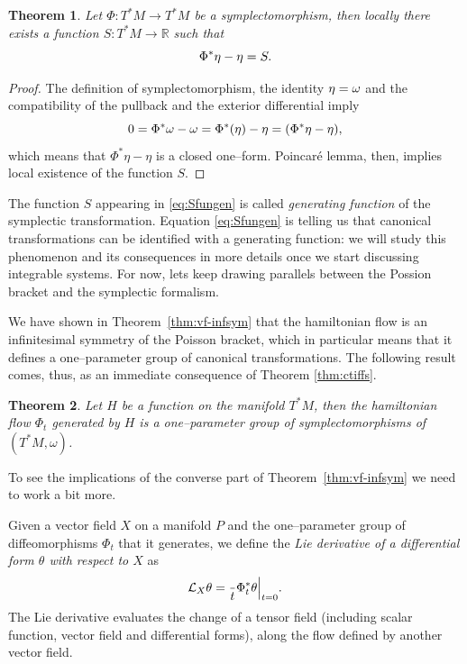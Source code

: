 \documentclass[english,fontsize=11pt,paper=a5,oneside]{scrbook}
\newcommand{\cL}{\mathcal{L}}
\newcommand{\R}{\mathbb{R}}
\let\d\relax
\DeclareMathOperator{\d}{d}
\newtheorem{theorem}{Theorem}[chapter]
\theoremstyle{definition}
\begin{document}
\begin{theorem}\label{thm:genfun}
    Let $\Phi: T^*M \to T^*M$ be a symplectomorphism, then locally there exists a function $S:T^*M\to\R$ such that
    \begin{equation}\label{eq:Sfungen}
        \Phi^*\eta - \eta = \d S.
    \end{equation}
\end{theorem}
\begin{proof}
    The definition of symplectomorphism, the identity $\d\eta = \omega$ and the compatibility of the pullback and the exterior differential imply
    \begin{equation}
        0 = \Phi^*\omega - \omega = \Phi^*(\d\eta) - \d\eta = \d(\Phi^*\eta - \eta),
    \end{equation}
    which means that $\Phi^*\eta - \eta$ is a closed one--form.
    Poincar\'e lemma, then, implies local existence of the function $S$.
\end{proof}

The function $S$ appearing in \eqref{eq:Sfungen} is called \emph{generating function} of the symplectic transformation.
Equation \eqref{eq:Sfungen} is telling us that canonical transformations can be identified with a generating function: we will study this phenomenon and its consequences in more details once we start discussing integrable systems.
For now, lets keep drawing parallels between the Possion bracket and the symplectic formalism.

We have shown in Theorem~\ref{thm:vf-infsym} that the hamiltonian flow is an infinitesimal symmetry of the Poisson bracket, which in particular means that it defines a one--parameter group of canonical transformations.
The following result comes, thus, as an immediate consequence of Theorem \ref{thm:ctiffs}.

\begin{theorem}
    Let $H$ be a function on the manifold $T^*M$, then the hamiltonian flow $\Phi_t$ generated by $H$ is a one--parameter group of symplectomorphisms of $(T^*M, \omega)$.
\end{theorem}

To see the implications of the converse part of Theorem~\ref{thm:vf-infsym} we need to work a bit more.

Given a vector field $X$ on a manifold $P$ and the one--parameter group of diffeomorphisms $\Phi_t$ that it generates, we define the \emph{Lie derivative of a differential form $\theta$ with respect to $X$} as
\begin{equation}
    \cL_X \theta = \frac{\d}{\d t}\Phi_t^*\theta \Big|_{t=0}.
\end{equation}
The Lie derivative evaluates the change of a tensor field (including scalar function, vector field and differential forms), along the flow defined by another vector field.
\end{document}
